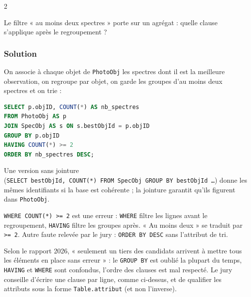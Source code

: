\documentclass[11pt,a4paper]{article}
\begin{document}
\begin{indication}{2}

Le filtre « au moins deux spectres » porte sur un agrégat : quelle clause s'applique après le regroupement ?

\end{indication}

\hypertarget{solution-3}{%
\subsubsection{Solution}\label{solution-3}}

On associe à chaque objet de \texttt{PhotoObj} les spectres dont il est la meilleure observation, on regroupe par objet, on garde les groupes d'au moins deux spectres et on trie :

\begin{lstlisting}[language=SQL]
SELECT p.objID, COUNT(*) AS nb_spectres
FROM PhotoObj AS p
JOIN SpecObj AS s ON s.bestObjId = p.objID
GROUP BY p.objID
HAVING COUNT(*) >= 2
ORDER BY nb_spectres DESC;
\end{lstlisting}

Une version sans jointure (\texttt{SELECT\ bestObjId,\allowbreak{}\ COUNT(\allowbreak{}*)\allowbreak{}\ FROM\ SpecObj\ GROUP\ BY\ bestObjId\ …}) donne les mêmes identifiants si la base est cohérente ; la jointure garantit qu'ils figurent dans \texttt{PhotoObj}.

\begin{piege}

\texttt{WHERE\ COUNT(\allowbreak{}*)\allowbreak{}\ \textgreater{}=\allowbreak{}\ 2} est une erreur : \texttt{WHERE} filtre les lignes avant le regroupement, \texttt{HAVING} filtre les groupes après. « Au moins deux » se traduit par \texttt{\textgreater{}=\ 2}. Autre faute relevée par le jury : \texttt{ORDER\ BY\ DESC} sans l'attribut de tri.

\end{piege}

\begin{jury}

Selon le rapport 2026, « seulement un tiers des candidats arrivent à mettre tous les éléments en place sans erreur » : le \texttt{GROUP\ BY} est oublié la plupart du temps, \texttt{HAVING} et \texttt{WHERE} sont confondus, l'ordre des clauses est mal respecté. Le jury conseille d'écrire une clause par ligne, comme ci-dessus, et de qualifier les attributs sous la forme \texttt{Table.attribut} (et non l'inverse).

\end{jury}
\end{document}
